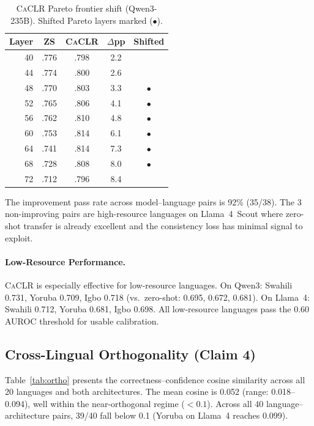 \documentclass[11pt,a4paper]{article}
\newcommand{\caclr}{\textsc{CaCLR}}
\begin{document}
\begin{table}[t]
\centering
\small
\caption{\caclr{} Pareto frontier shift (Qwen3-235B). Shifted Pareto layers marked ($\bullet$).}
\label{tab:pareto_shift}
\begin{tabular}{rcccc}
\toprule
Layer & ZS & \caclr{} & $\Delta$pp & Shifted \\
\midrule
40 & .776 & .798 & 2.2 & \\
44 & .774 & .800 & 2.6 & \\
48 & .770 & .803 & 3.3 & $\bullet$ \\
52 & .765 & .806 & 4.1 & $\bullet$ \\
56 & .762 & .810 & 4.8 & $\bullet$ \\
60 & .753 & .814 & 6.1 & $\bullet$ \\
64 & .741 & .814 & 7.3 & $\bullet$ \\
68 & .728 & .808 & 8.0 & $\bullet$ \\
72 & .712 & .796 & 8.4 & \\
\bottomrule
\end{tabular}
\end{table}

The improvement pass rate across model--language pairs is 92\% (35/38). The 3 non-improving pairs are high-resource languages on Llama~4~Scout where zero-shot transfer is already excellent and the consistency loss has minimal signal to exploit.

\paragraph{Low-Resource Performance.}
\caclr{} is especially effective for low-resource languages. On Qwen3: Swahili 0.731, Yoruba 0.709, Igbo 0.718 (vs.\ zero-shot: 0.695, 0.672, 0.681). On Llama~4: Swahili 0.712, Yoruba 0.681, Igbo 0.698. All low-resource languages pass the 0.60 AUROC threshold for usable calibration.

\subsection{Cross-Lingual Orthogonality (Claim 4)}
\label{sec:res_ortho}

Table~\ref{tab:ortho} presents the correctness--confidence cosine similarity across all 20 languages and both architectures. The mean cosine is 0.052 (range: 0.018--0.094), well within the near-orthogonal regime ($<0.1$). Across all 40 language--architecture pairs, 39/40 fall below 0.1 (Yoruba on Llama~4 reaches 0.099).
\end{document}

